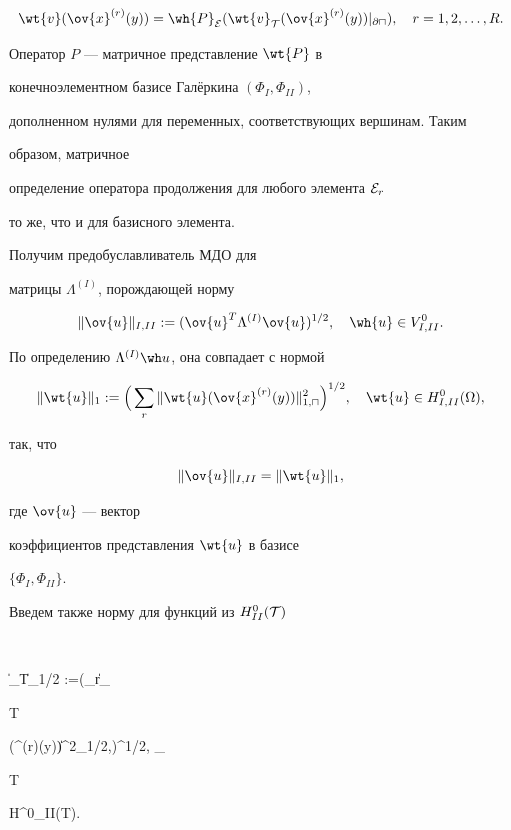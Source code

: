 $$


\wt{v}(\ov{x}^{(r)}(y)) = 


\wh{P}_{\cal {E}}(\wt{v}_{{\cal 


T}}(\ov{x}^{(r)}(y))|_{\partial\sqcap}), \quad


r=1,2,\dotsc,R.


$$


Оператор $P$ --- матричное представление $\wt{P}$ в 


конечноэлементном базисе Гал\"еркина $(\Phi_I,\Phi_{II})$,


дополненном нулями для переменных, соответствующих вершинам. Таким 


образом, матричное 


определение оператора продолжения для любого элемента ${\cal E}_r$ 


то же, что и для базисного элемента.





Получим предобуславливатель МДО для 


матрицы $\Lambda^{(I)}$, порождающей норму 


$$


\|\ov{u}\|_{I,II}:=(\ov{u}^T\Lambda^{(I)}\ov{u})^{1/2}, \quad


\wh{u} \in V^0_{I,II}.


$$


По определению $\Lambda^{(I)}\wh u$, она совпадает с нормой


$$


\|\wt{u}\|_1:=\Big(\sum_r


\|\wt{u}(\ov{x}^{(r)}(y))\|^2_{1,\sqcap}\Big)^{1/2}, \quad \wt{u} \in


H^0_{I,II}(\Omega),


$$


так, что


\begin{equation}\label{5.12}


\|\ov{u}\|_{I,II}= \|\wt{u}\|_1,


\end{equation}


где $\ov{u}$ --- вектор


коэффициентов представления $\wt{u}$ в базисе


$\{\Phi_I,\Phi_{II}\}$.


Введем также норму для функций из $H^0_{II}({\cal T})$


$$


\|_{{\cal T}}\|_{1/2} :=\Big(\sum_r\|_{{\cal


T}}(^{(r)}(y))\|^2_{1/2,\sqcap}\Big)^{1/2}, \quad {}_{{\cal


T}} \in H^0_{II}({\cal T}).


